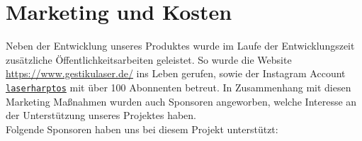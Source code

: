 \chapter{Marketing und Kosten}
\label{ch:Kosten}

Neben der Entwicklung unseres Produktes wurde im Laufe der Entwicklungszeit zusätzliche Öffentlichkeitsarbeiten geleistet. So wurde die Website \url{https://www.gestikulaser.de/} ins Leben gerufen, sowie der Instagram Account \href{https://www.instagram.com/laserharptos/}{\texttt{laserharptos}} mit über 100 Abonnenten betreut. In Zusammenhang mit diesen Marketing Maßnahmen wurden auch Sponsoren angeworben, welche Interesse an der Unterstützung unseres Projektes haben. \\
Folgende Sponsoren haben uns bei diesem Projekt unterstützt: \\

